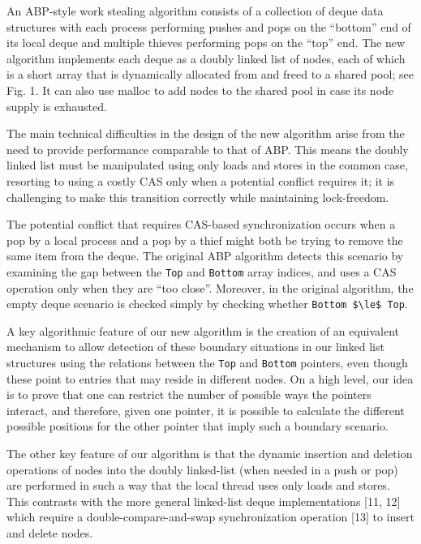 An ABP-style work stealing algorithm consists of a collection of deque
data structures with each process performing pushes and pops on the
``bottom'' end of its local deque and multiple thieves performing pops
on the ``top'' end. The new algorithm implements each deque as a
doubly linked list of nodes, each of which is a short array that is
dynamically allocated from and freed to a shared pool; see Fig. 1. It
can also use malloc to add nodes to the shared pool in case its node
supply is exhausted.

The main technical difficulties in the design of the new algorithm
arise from the need to provide performance comparable to that of
ABP. This means the doubly linked list must be manipulated using only
loads and stores in the common case, resorting to using a costly CAS
only when a potential conflict requires it; it is challenging to make
this transition correctly while maintaining lock-freedom.

The potential conflict that requires CAS-based synchronization occurs
when a pop by a local process and a pop by a thief might both be
trying to remove the same item from the deque. The original ABP
algorithm detects this scenario by examining the gap between the
\lstinline!Top! and \lstinline!Bottom! array indices, and uses a CAS
operation only when they are ``too close''. Moreover, in the original
algorithm, the empty deque scenario is checked simply by checking
whether \lstinline!Bottom $\le$ Top!.

A key algorithmic feature of our new algorithm is the creation of an
equivalent mechanism to allow detection of these boundary situations
in our linked list structures using the relations between the
\lstinline!Top! and \lstinline!Bottom! pointers, even though these
point to entries that may reside in different nodes. On a high level,
our idea is to prove that one can restrict the number of possible ways
the pointers interact, and therefore, given one pointer, it is
possible to calculate the different possible positions for the other
pointer that imply such a boundary scenario.

The other key feature of our algorithm is that the dynamic insertion
and deletion operations of nodes into the doubly linked-list (when
needed in a push or pop) are performed in such a way that the local
thread uses only loads and stores. This contrasts with the more
general linked-list deque implementations [11, 12] which require a
double-compare-and-swap synchronization operation [13] to insert and
delete nodes.

